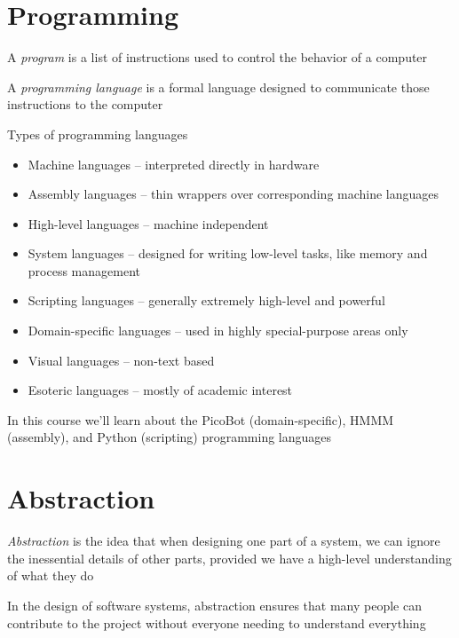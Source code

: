 \documentclass[8pt,a4paper,compress]{beamer}
\begin{document}
\section{Programming}
\begin{frame}[fragile]
A \emph{program} is a list of instructions used to control the behavior of a computer

\bigskip

A \emph{programming language} is a formal language designed to communicate those instructions to the computer

\bigskip

Types of programming languages
\begin{itemize}
\item Machine languages -- interpreted directly in hardware
\item Assembly languages -- thin wrappers over corresponding machine languages
\item High-level languages -- machine independent
\item System languages -- designed for writing low-level tasks, like memory and process management
\item Scripting languages -- generally extremely high-level and powerful
\item Domain-specific languages -- used in highly special-purpose areas only
\item Visual languages -- non-text based
\item Esoteric languages -- mostly of academic interest
\end{itemize}

\bigskip

In this course we'll learn about the PicoBot (domain-specific), HMMM (assembly), and Python (scripting) programming languages
\end{frame}

\section{Abstraction}
\begin{frame}[fragile]
\emph{Abstraction} is the idea that when designing one part of a system, we can ignore the inessential details of other parts, provided we have a high-level understanding of what they do

\bigskip

In the design of software systems, abstraction ensures that many people can contribute to the project without everyone needing to understand everything
\end{frame}
\end{document}
